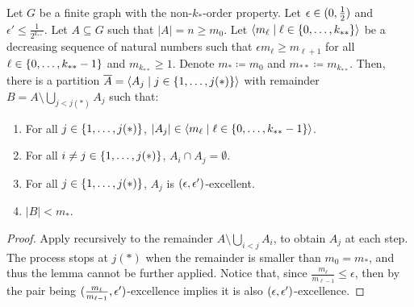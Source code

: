         \begin{lemma} \label{lem:existance_of_excellent_partition}
            Let $G$ be a finite graph with the non-$k_{*}$-order property.
            Let $\epsilon \in ( 0, \frac{1}{2} )$ and $\epsilon' \leq \frac{1}{2^{k_{**}}}$.
            Let $A \subseteq G$ such that $|A| = n \geq m_0$.
            Let $\left< m_\ell \mid \ell \in \{ 0, \dots, k_{**} \} \right>$ be a decreasing sequence of natural numbers such that
            $\epsilon m_{\ell} \geq m_{\ell+1}$ for all $\ell \in \{ 0, \dots, k_{**}-1 \}$ and $m_{k_{**}} \geq 1$.
            Denote $m_* \coloneqq m_0$ and $m_{**} \coloneqq m_{k_{**}}$.
            Then, there is a partition $\overline{A} = \left< A_j \mid j \in \{ 1, \dots, j(*) \} \right>$ with remainder
            $B = A \setminus \bigcup_{j < j(*)} A_j$ such that:
            \begin{enumerate}[label={\Roman*}., ref={\Roman*}, font=\rmfamily]
                \item \label{itm:existance_of_excellent_partition.a} For all $j \in \{ 1, \dots, j(*) \}$, $|A_j| \in \left< m_\ell \mid \ell \in \{ 0, \dots, k_{**}-1 \} \right>$.
                \item \label{itm:existance_of_excellent_partition.b} For all $i \neq j \in \{ 1, \dots, j(*) \}$, $A_i \cap A_j = \emptyset$.
                \item \label{itm:existance_of_excellent_partition.c} For all $j \in \{ 1, \dots, j(*) \}$, $A_j$ is $( \epsilon, \epsilon' )$-excellent.
                \item \label{itm:existance_of_excellent_partition.d} $|B| < m_*$.
            \end{enumerate}
            \begin{proof}
                Apply  recursively to the remainder
                $A \setminus \bigcup_{i < j} A_i$, to obtain $A_j$ at each step.
                The process stops at $j(*)$ when the remainder is smaller than $m_0 = m_*$, and thus
                the lemma cannot be further applied.
                Notice that, since $\frac{m_\ell}{m_{\ell-1}} \leq \epsilon$, then by 
                the pair being $( \frac{m_\ell}{m_{\ell-1}}, \epsilon' )$-excellence
                implies it is also $( \epsilon, \epsilon' )$-excellence.
            \end{proof}
        \end{lemma}


